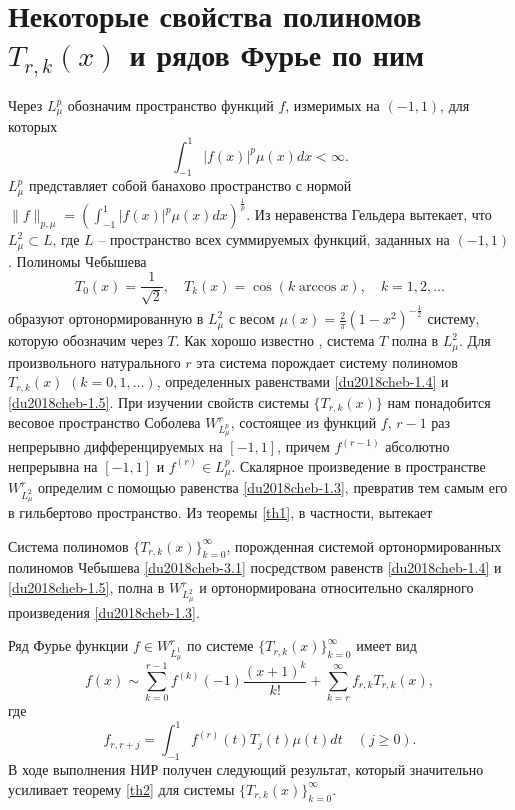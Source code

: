 \section{Некоторые свойства полиномов $T_{r,k}(x)$ и рядов Фурье по ним}
Через $L^p_\mu$ обозначим пространство  функций $f$, измеримых  на  $(-1,1)$, для которых
$$\int_{-1}^1|f(x)|^p\mu(x)dx<\infty.$$
$L^p_\mu$ представляет собой банахово пространство с нормой $\|f\|_{p,\mu}=(\int_{-1}^1|f(x)|^p\mu(x)dx)^\frac1p$. Из неравенства Гельдера вытекает, что $L^2_\mu\subset L$, где $L$ -- пространство всех суммируемых функций, заданных на $(-1,1)$. Полиномы Чебышева
\begin{equation}\label{du2018cheb-3.1}
T_0(x)=\frac{1}{\sqrt{2}},\quad T_k(x)=\cos(k\arccos x), \quad k=1,2,\ldots
\end{equation}
образуют ортонормированную  в $L_\mu^2$ с весом  $\mu(x)=\frac2\pi(1-x^2)^{-\frac12}$ систему, которую обозначим через $T$. Как хорошо известно \cite{Sege}, система $T$ полна в $L_\mu^2$.   Для произвольного натурального $r$ эта система порождает  систему полиномов $T_{r,k}(x)$ $(k=0,1,\ldots)$, определенных равенствами \eqref{du2018cheb-1.4} и \eqref{du2018cheb-1.5}. При изучении свойств системы $\{T_{r,k}(x)\}$ нам понадобится весовое пространство Соболева $W^r_{L^p_\mu}$, состоящее из функций $f$, $r-1$ раз непрерывно дифференцируемых на $[-1,1]$, причем $f^{(r-1)}$ абсолютно непрерывна на $[-1,1]$  и $f^{(r)}\in L^p_\mu$.
Скалярное произведение в пространстве $W^r_{L^2_\mu}$ определим с помощью равенства
\eqref{du2018cheb-1.3}, превратив тем самым его в гильбертово пространство. Из теоремы \ref{th1}, в частности, вытекает

\begin{theorem}\label{du2018cheb-thC}
	Система полиномов $\{T_{r,k}(x)\}_{k=0}^\infty$, порожденная системой ортонормированных полиномов Чебышева \eqref{du2018cheb-3.1} посредством равенств \eqref{du2018cheb-1.4} и \eqref{du2018cheb-1.5}, полна  в $W^r_{L^2_\mu}$ и ортонормирована относительно скалярного произведения \eqref{du2018cheb-1.3}.
\end{theorem}

Ряд Фурье функции $f\in W_{L_\mu^1}^r$ по системе   $\{T_{r,k}(x)\}_{k=0}^\infty$ имеет вид
\begin{equation}\label{du2018cheb-3.2}
f(x)\sim \sum_{k=0}^{r-1} f^{(k)}(-1)\frac{(x+1)^k}{k!}+ \sum_{k=r}^\infty f_{r,k}T_{r,k}(x),
\end{equation}
где
\begin{equation}\label{du2018cheb-3.3}
f_{r,r+j}=\int_{-1}^1 f^{(r)}(t)T_{j}(t)\mu(t)dt\quad(j\ge0).
\end{equation}
В ходе выполнения НИР получен следующий результат, который значительно усиливает теорему \ref{th2} для системы  $\{T_{r,k}(x)\}_{k=0}^\infty$.

